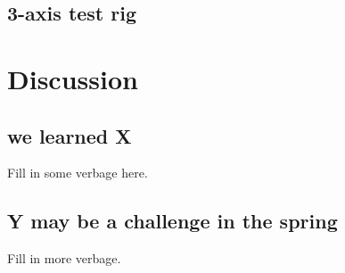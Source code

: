\documentclass[10pt]{article}
\begin{document}
\subsection{3-axis test rig}

\section{Discussion}
\subsection{we learned X}
Fill in some verbage here.

\subsection{Y may be a challenge in the spring}
Fill in more verbage.

\end{document}
